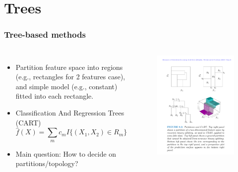 \documentclass{beamer}
\begin{document}
\section{Trees}

\begin{frame}
\frametitle{Tree-based methods}
\begin{columns}
\begin{itemize}
        \item Partition feature space into regions (e.g., rectangles for 2 features case), and simple model (e.g., constant) fitted into each rectangle.
        \item Classification And Regression Trees (CART)
        \begin{equation*}
            \hat{f}(X) = \sum_{m} c_m I\{(X_1,X_2) \in R_m\}
        \end{equation*}
        \item Main question: How to decide on partitions/topology?
\end{itemize}
\begin{figure}
            \centering
            \includegraphics[width=\textwidth]{figures/cart.pdf}
        \end{figure}
\end{columns}
\end{frame}
\end{document}
